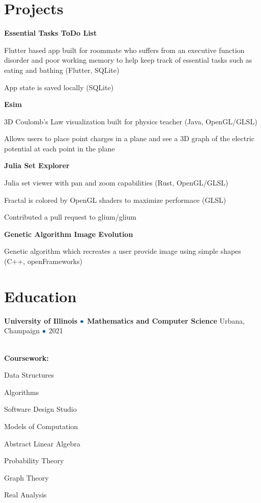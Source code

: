 \documentclass[hidelinks,11pt]{extarticle}
\let\boringbullet\bullet
\renewcommand{\bullet}{\color{mycolor}{\boringbullet}}
\newcommand{\school}[4]{
	{\textbf{#1
    $\bullet$
     #3
    }}
	\hfill{
        {\small#2
    $\bullet$
    #4}
    }
}
\newcommand{\project}[3] {
    \textbf{#1} 
    \begin{citemize}
    #3
    \end{citemize}
}
\begin{document}
\section{Projects}

\project{Essential Tasks ToDo List}{Dart}
{
    \item Flutter based app built for roommate who suffers from an executive 
        function disorder and poor working memory to help keep track of essential 
        tasks such as eating and bathing (Flutter, SQLite)
    \item App state is saved locally (SQLite)
}

\project{Esim}{Java}
{
    \item 3D Coulomb's Law visualization built for physics teacher (Java, OpenGL/GLSL)
    \item Allows users to place point charges in a plane and see a 3D graph of the
        electric potential at each point in the plane
}

\project{Julia Set Explorer}{Rust}
{
    \item Julia set viewer with pan and zoom capabilities (Rust, OpenGL/GLSL)
    \item Fractal is colored by OpenGL shaders to maximize performace (GLSL)
    \item Contributed a pull request to glium/glium
}

\project{Genetic Algorithm Image Evolution}{C++}
{
    \item Genetic algorithm which recreates a user provide image using simple 
        shapes (C++, openFrameworks)
}



\section{Education}
\school
{University of Illinois}
{Urbana, Champaign}
{Mathematics and Computer Science}
{2021}
\\
\textbf{Coursework:} 
\begin{citemize*}
    \item[] Data Structures 
    \item Algorithms 
    \item Software Design Studio 
    \item Models of Computation 
    \item Abstract Linear Algebra 
    \item Probability Theory 
    \item Graph Theory 
    \item Real Analysis 
\end{citemize*}
\end{document}
